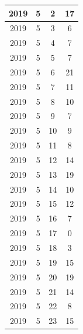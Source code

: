 \begin{longtable} {|c|c|c|c|}
\hline
2019         & 5            & 2            & 17                        \\ 
\hline
2019         & 5            & 3            & 6                         \\ 
\hline
2019         & 5            & 4            & 7                         \\ 
\hline
2019         & 5            & 5            & 7                         \\ 
\hline
2019         & 5            & 6            & 21                        \\ 
\hline
2019         & 5            & 7            & 11                        \\ 
\hline
2019         & 5            & 8            & 10                        \\ 
\hline
2019         & 5            & 9            & 7                         \\ 
\hline
2019         & 5            & 10           & 9                         \\ 
\hline
2019         & 5            & 11           & 8                         \\ 
\hline
2019         & 5            & 12           & 14                        \\ 
\hline
2019         & 5            & 13           & 19                        \\ 
\hline
2019         & 5            & 14           & 10                        \\ 
\hline
2019         & 5            & 15           & 12                        \\ 
\hline
2019         & 5            & 16           & 7                         \\ 
\hline
2019         & 5            & 17           & 0                         \\ 
\hline
2019         & 5            & 18           & 3                         \\ 
\hline
2019         & 5            & 19           & 15                        \\ 
\hline
2019         & 5            & 20           & 19                        \\ 
\hline
2019         & 5            & 21           & 14                        \\ 
\hline
2019         & 5            & 22           & 8                         \\ 
\hline
2019         & 5            & 23           & 15                        \\ 

\end{longtable}
